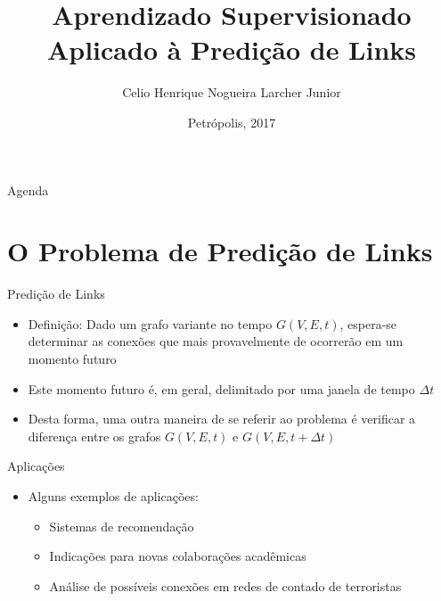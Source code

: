 \documentclass{beamer}
\title{Aprendizado Supervisionado \\Aplicado à Predição de Links}
\author{Celio Henrique Nogueira Larcher Junior}
\institute[Laboratório Nacional de Computação Científica] %
{
  Laboratório Nacional de Computação Científica
  }
\date{Petrópolis, 2017}
\begin{document}
\begin{frame}
  \titlepage
\end{frame}

\begin{frame}{Agenda}
\footnotesize
  \tableofcontents
\end{frame}





\section{O Problema de Predição de Links}



\begin{frame}{Predição de Links}
	\begin{itemize}
		\item Definição: Dado um grafo variante no tempo $G(V,E,t)$, espera-se determinar as conexões que mais provavelmente de ocorrerão em um momento futuro
		\item Este momento futuro é, em geral, delimitado por uma janela de tempo $\Delta t$
		\item Desta forma, uma outra maneira de se referir ao problema é verificar a diferença entre os grafos $G(V,E,t)$ e $G(V,E,t+\Delta t)$
	\end{itemize}
\end{frame}


\begin{frame}{Aplicações}
	\begin{itemize}
		\item Alguns exemplos de aplicações:
		\begin{itemize}
			\item Sistemas de recomendação
			\item Indicações para novas colaborações
acadêmicas
			\item Análise de possíveis conexões em redes de contado de terroristas
		\end{itemize}
	\end{itemize}
\end{frame}
\end{document}
